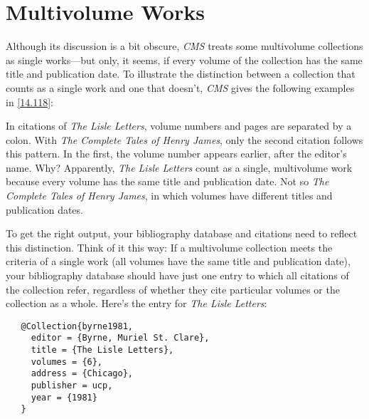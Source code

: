 \documentclass[11pt,letterpaper,oneside]{article}
\begin{document}
\section{Multivolume Works}
\label{multivolume}


Although its discussion is a bit obscure, \textit{CMS} treats some
multivolume collections as single works---but only, it seems, if every
volume of the collection has the same title and publication date. To
illustrate the distinction between a collection that counts as a
single work and one that doesn't, \textit{CMS} gives the following
examples in \ref{14.118}:

\begin{citeonly}
\item \cite[4:243]{byrne1981}
\item \cite*[32--33]{james1963.5}
\item \cite[4:245]{byrne1981}
\item \cite*[34]{james1963.5}
\end{citeonly}

In citations of \textit{The Lisle Letters}, volume numbers and pages
are separated by a colon. With \textit{The Complete Tales of Henry
James}, only the second citation follows this pattern. In the first,
the volume number appears earlier, after the editor's name. Why?
Apparently, \textit{The Lisle Letters} count as a single, multivolume
work because every volume has the same title and publication date. Not
so \textit{The Complete Tales of Henry James}, in which volumes have
different titles and publication dates.

To get the right output, your bibliography database and citations need
to reflect this distinction. Think of it this way: If a multivolume
collection meets the criteria of a single work (all volumes have the
same title and publication date), your bibliography database should
have just one entry to which all citations of the collection refer,
regardless of whether they cite particular volumes or the collection
as a whole. Here's the entry for \textit{The Lisle Letters}:

\begin{verbatim}
   @Collection{byrne1981,
     editor = {Byrne, Muriel St. Clare},
     title = {The Lisle Letters},
     volumes = {6},
     address = {Chicago},
     publisher = ucp,
     year = {1981}
   }
\end{verbatim}
\end{document}
